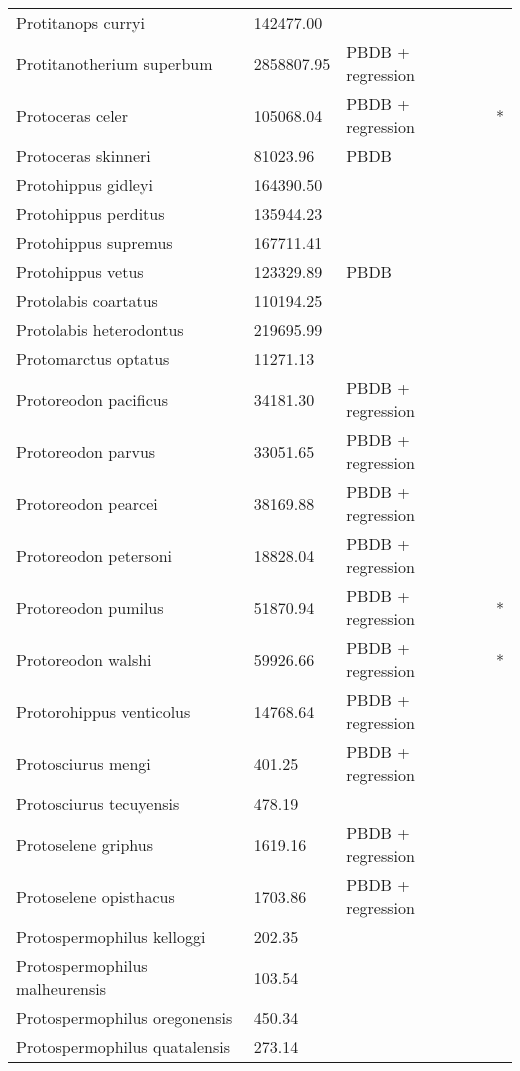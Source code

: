 \documentclass{article}
\begin{document}
\begin{center}
\begin{longtable}{p{} p{} p{} p{}}
    Protitanops curryi & 142477.00 & \cite{McKenna2011} &  \\ 
    Protitanotherium superbum & 2858807.95 & PBDB + regression &  \\ 
    Protoceras celer & 105068.04 & PBDB + regression & * \\ 
    Protoceras skinneri & 81023.96 & PBDB &  \\ 
    Protohippus gidleyi & 164390.50 & \cite{Tomiya2013} &  \\ 
    Protohippus perditus & 135944.23 & \cite{Tomiya2013} &  \\ 
    Protohippus supremus & 167711.41 & \cite{Tomiya2013} &  \\ 
    Protohippus vetus & 123329.89 & PBDB &  \\ 
    Protolabis coartatus & 110194.25 & \cite{Tomiya2013} &  \\ 
    Protolabis heterodontus & 219695.99 & \cite{Tomiya2013} &  \\ 
    Protomarctus optatus & 11271.13 & \cite{Tomiya2013} &  \\ 
    Protoreodon pacificus & 34181.30 & PBDB + regression &  \\ 
    Protoreodon parvus & 33051.65 & PBDB + regression &  \\ 
    Protoreodon pearcei & 38169.88 & PBDB + regression &  \\ 
    Protoreodon petersoni & 18828.04 & PBDB + regression &  \\ 
    Protoreodon pumilus & 51870.94 & PBDB + regression & * \\ 
    Protoreodon walshi & 59926.66 & PBDB + regression & * \\ 
    Protorohippus venticolus & 14768.64 & PBDB + regression &  \\ 
    Protosciurus mengi & 401.25 & PBDB + regression &  \\ 
    Protosciurus tecuyensis & 478.19 & \cite{Tomiya2013} &  \\ 
    Protoselene griphus & 1619.16 & PBDB + regression &  \\ 
    Protoselene opisthacus & 1703.86 & PBDB + regression &  \\ 
    Protospermophilus kelloggi & 202.35 & \cite{Tomiya2013} &  \\ 
    Protospermophilus malheurensis & 103.54 & \cite{Tomiya2013} &  \\ 
    Protospermophilus oregonensis & 450.34 & \cite{Tomiya2013} &  \\ 
    Protospermophilus quatalensis & 273.14 & \cite{Tomiya2013} &  \\ 

\end{longtable}
\end{center}
\end{document}
